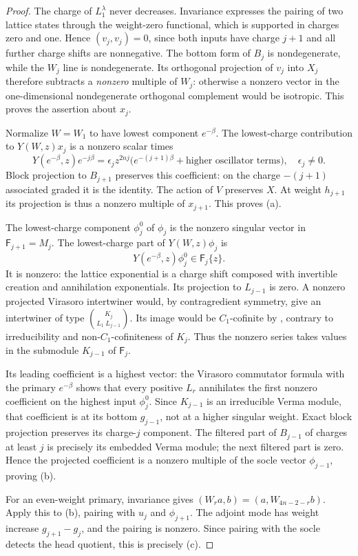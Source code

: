 \documentclass[11pt]{article}
\numberwithin{equation}{section}
\begin{document}
\begin{proof}
The charge of $L_1^\lambda$ never decreases. Invariance expresses the pairing of two lattice states through the weight-zero functional, which is supported in charges zero and one. Hence $(v_j,v_j)=0$, since both inputs have charge $j+1$ and all further charge shifts are nonnegative. The bottom form of $B_j$ is nondegenerate, while the $W_j$ line is nondegenerate. Its orthogonal projection of $v_j$ into $X_j$ therefore subtracts a \emph{nonzero} multiple of $W_j$: otherwise a nonzero vector in the one-dimensional nondegenerate orthogonal complement would be isotropic. This proves the assertion about $x_j$.

Normalize $W=W_1$ to have lowest component $e^{-\beta}$. The lowest-charge contribution to $Y(W,z)x_j$ is a nonzero scalar times
\[
 Y(e^{-\beta},z)e^{-j\beta}
 =\epsilon_j z^{2nj}\bigl(e^{-(j+1)\beta}+\text{higher oscillator terms}\bigr),
 \quad\epsilon_j\ne0.
\]
Block projection to $B_{j+1}$ preserves this coefficient: on the charge $-(j+1)$ associated graded it is the identity. The action of $V$ preserves $X$. At weight $h_{j+1}$ its projection is thus a nonzero multiple of $x_{j+1}$. This proves (a).

The lowest-charge component $\phi_j^0$ of $\phi_j$ is the nonzero singular vector in $\mathsf F_{j+1}=M_j$. The lowest-charge part of $Y(W,z)\phi_j$ is
\[
 Y(e^{-\beta},z)\phi_j^0\in\mathsf F_j\{z\}.
\]
It is nonzero: the lattice exponential is a charge shift composed with invertible creation and annihilation exponentials. Its projection to $L_{j-1}$ is zero. A nonzero projected Virasoro intertwiner would, by contragredient symmetry, give an intertwiner of type $\binom{K_j}{L_1\ L_{j-1}}$. Its image would be $C_1$-cofinite by \cite[Theorem 4.1.7]{A:CJORY}, contrary to irreducibility and non-$C_1$-cofiniteness of $K_j$. Thus the nonzero series takes values in the submodule $K_{j-1}$ of $\mathsf F_j$.

Its leading coefficient is a highest vector: the Virasoro commutator formula with the primary $e^{-\beta}$ shows that every positive $L_r$ annihilates the first nonzero coefficient on the highest input $\phi_j^0$. Since $K_{j-1}$ is an irreducible Verma module, that coefficient is at its bottom $g_{j-1}$, not at a higher singular weight. Exact block projection preserves its charge-$j$ component. The filtered part of $B_{j-1}$ of charges at least $j$ is precisely its embedded Verma module; the next filtered part is zero. Hence the projected coefficient is a nonzero multiple of the socle vector $\phi_{j-1}$, proving (b).

For an even-weight primary, invariance gives $(W_r a,b)=(a,W_{4n-2-r}b)$. Apply this to (b), pairing with $u_j$ and $\phi_{j+1}$. The adjoint mode has weight increase $g_{j+1}-g_j$, and the pairing is nonzero. Since pairing with the socle detects the head quotient, this is precisely (c).
\end{proof}
\end{document}
